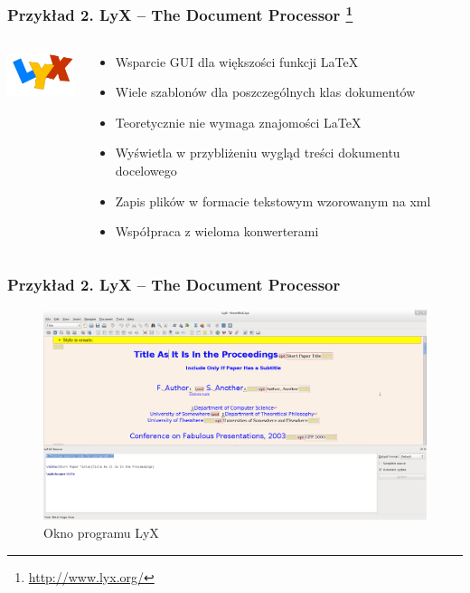 \documentclass[t]{beamer}
\begin{document}
\begin{frame}[t]
	\frametitle{Przykład 2. LyX – The Document Processor \footnote{\url{http://www.lyx.org/}}}
		\begin{columns}[T]
			\begin{column}{.15\textwidth}
				\includegraphics[width=2cm]{lyx_logo.png}
			\end{column}
			\begin{column}{.85\textwidth}
				\begin{itemize}
					\item Wsparcie GUI dla większości funkcji \LaTeX\ 
					\item Wiele szablonów dla poszczególnych klas dokumentów
					\item Teoretycznie nie wymaga znajomości \LaTeX\ 
					\item Wyświetla w przybliżeniu wygląd treści dokumentu docelowego
					\item Zapis plików w formacie tekstowym wzorowanym na xml
					\item Współpraca z wieloma konwerterami
				\end{itemize}
			\end{column}		
		\end{columns}
\end{frame}

\begin{frame}[t]
	\frametitle{Przykład 2. LyX – The Document Processor}
		\begin{figure}[p]
     	    \centering
			\includegraphics[width=.95\textwidth]{lyx_prtscn.png}
     	    \caption{Okno programu LyX}
		\end{figure}
		
\end{frame}
\end{document}
